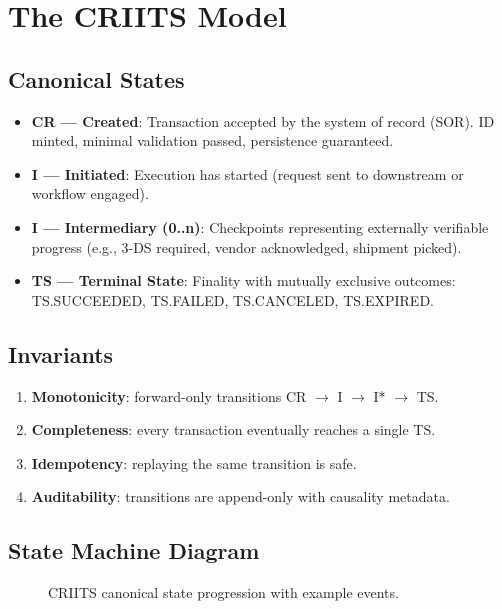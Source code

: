 \documentclass[11pt]{article}
\begin{document}
\section{The CRIITS Model}
\subsection{Canonical States}
\begin{itemize}[leftmargin=*]
\item \textbf{CR — Created}: Transaction accepted by the system of record (SOR). ID minted, minimal validation passed, persistence guaranteed.
\item \textbf{I — Initiated}: Execution has started (request sent to downstream or workflow engaged).
\item \textbf{I — Intermediary (0..n)}: Checkpoints representing externally verifiable progress (e.g., 3-DS required, vendor acknowledged, shipment picked).
\item \textbf{TS — Terminal State}: Finality with mutually exclusive outcomes: TS.SUCCEEDED, TS.FAILED, TS.CANCELED, TS.EXPIRED.
\end{itemize}

\subsection{Invariants}
\begin{enumerate}[leftmargin=*]
\item \textbf{Monotonicity}: forward-only transitions CR $\to$ I $\to$ I* $\to$ TS.
\item \textbf{Completeness}: every transaction eventually reaches a single TS.
\item \textbf{Idempotency}: replaying the same transition is safe.
\item \textbf{Auditability}: transitions are append-only with causality metadata.
\end{enumerate}

\subsection{State Machine Diagram}
\begin{figure}[h]
\centering
{}
\caption{CRIITS canonical state progression with example events.}
\end{figure}
\end{document}

